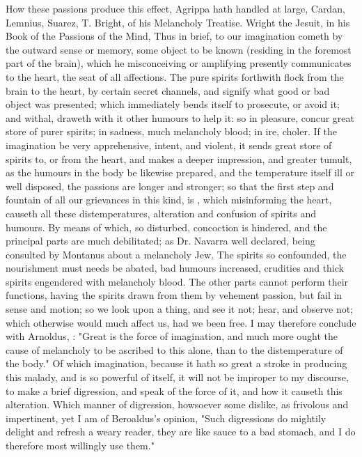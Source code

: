 How these passions produce this effect, Agrippa hath
handled at large,  Cardan,
 Lemnius,  Suarez,
 T. Bright,
 of his Melancholy Treatise. Wright the Jesuit,
in his Book of the Passions of the Mind, \etc{} Thus in brief, to our
imagination cometh by the outward sense or memory, some object to be known
(residing in the foremost part of the brain), which he misconceiving or
amplifying presently communicates to the heart, the seat of all affections. The
pure spirits forthwith flock from the brain to the heart, by certain secret
channels, and signify what good or bad object was presented;
which immediately bends itself to prosecute, or avoid it;
and withal, draweth with it other humours to help it: so in pleasure, concur
great store of purer spirits; in sadness, much melancholy blood; in ire,
choler. If the imagination be very apprehensive, intent, and violent, it sends
great store of spirits to, or from the heart, and makes a deeper impression,
and greater tumult, as the humours in the body be likewise prepared, and the
temperature itself ill or well disposed, the passions are longer and stronger;
so that the first step and fountain of all our grievances in this kind, is
, which misinforming the heart,
causeth all these distemperatures, alteration and confusion of spirits and
humours. By means of which, so disturbed, concoction is hindered, and the
principal parts are much debilitated; as Dr. Navarra well
declared, being consulted by Montanus about a melancholy Jew. The spirits so
confounded, the nourishment must needs be abated, bad humours increased,
crudities and thick spirits engendered with melancholy blood. The other parts
cannot perform their functions, having the spirits drawn from them by vehement
passion, but fail in sense and motion; so we look upon a thing, and see it not;
hear, and observe not; which otherwise would much affect us, had we been free.
I may therefore conclude with Arnoldus, : "Great is the force of imagination, and
much more ought the cause of melancholy to be ascribed to this alone, than to
the distemperature of the body." Of which imagination, because it hath so great
a stroke in producing this malady, and is so powerful of itself, it will not be
improper to my discourse, to make a brief digression, and speak of the force of
it, and how it causeth this alteration. Which manner of digression, howsoever
some dislike, as frivolous and impertinent, yet I am of
Beroaldus's opinion, "Such digressions do mightily delight
and refresh a weary reader, they are like sauce to a bad stomach, and I do
therefore most willingly use them."


